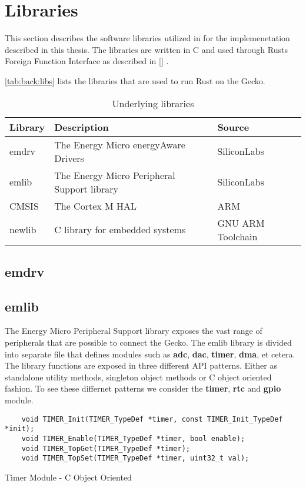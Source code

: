 \section{Libraries}
\label{sec:back:lib}

This section describes the software libraries utilized in for the implemenetation described in this thesis.
The libraries are written in C and used through Rusts Foreign Function Interface as described in \autoref{} .

\autoref{tab:back:libs} lists the libraries that are used to run Rust on the Gecko.

\begin{table}[H]
  \begin{tabular}{|l|l|l|}
    \hline
    Library & Description & Source \\
    \hline
    \hline
    emdrv & The Energy Micro energyAware Drivers & SiliconLabs \\
    emlib & The Energy Micro Peripheral Support library & SiliconLabs \\
    CMSIS & The Cortex M HAL & ARM \\
    newlib & C library for embedded systems & GNU ARM Toolchain \\
    \hline
  \end{tabular}
  \caption{Underlying libraries}
  \label{tab:back:libs}
\end{table}

\subsection{emdrv}
\subsection{emlib}

The Energy Micro Peripheral Support library exposes the vast range of peripherals that are possible to connect the Gecko.
The emlib library is divided into separate file that defines modules such as \textbf{adc}, \textbf{dac}, \textbf{timer}, \textbf{dma}, et cetera.
The library functions are exposed in three different API patterns.
Either as standalone utility methods, singleton object methods or C object oriented fashion.
To see these differnet patterns we consider the \textbf{timer}, \textbf{rtc} and \textbf{gpio} module.

\begin{listing}[H]
  \begin{verbatim}
    void TIMER_Init(TIMER_TypeDef *timer, const TIMER_Init_TypeDef *init);
    void TIMER_Enable(TIMER_TypeDef *timer, bool enable);
    void TIMER_TopGet(TIMER_TypeDef *timer);
    void TIMER_TopSet(TIMER_TypeDef *timer, uint32_t val);
  \end{verbatim}
  \caption{Timer Module - C Object Oriented}
  \label{lst:back:lib:timer}
\end{listing}

